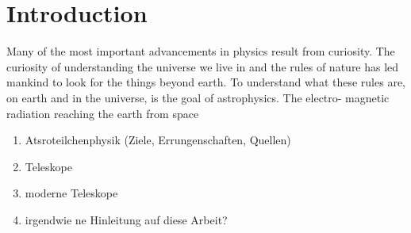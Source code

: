 \chapter{Introduction}
\nocite{biblatex, siunitx, scikit-learn, Hunter:2007}%

Many of the most important advancements in physics result from curiosity. The
curiosity of understanding the universe we live in and the rules of nature has
led mankind to look for the things beyond earth. To understand what these rules
are, on earth and in the universe, is the goal of astrophysics. The electro-
magnetic radiation reaching the earth from space

\begin{enumerate}
  \item Atsroteilchenphysik (Ziele, Errungenschaften, Quellen)
  \item Teleskope
  \item moderne Teleskope
  \item irgendwie ne Hinleitung auf diese Arbeit?
\end{enumerate}
